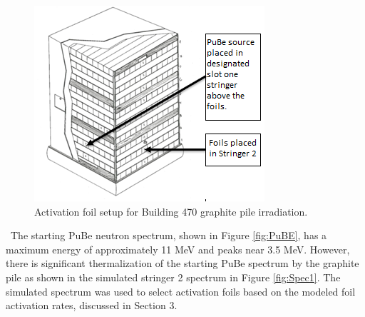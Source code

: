\documentclass[journal]{IEEEtran}
\let\MYoriglatexcaption\caption
\renewcommand{\caption}[2][\relax]{\MYoriglatexcaption[#2]{#2}}
\begin{document}
\begin{figure}[h!]
	\includegraphics[width=\linewidth]{Figures/PileSetup.png}
	\caption{Activation foil setup for Building 470 graphite pile irradiation.}
	\label{fig:pile}
\end{figure}

\ The starting PuBe neutron spectrum, shown in Figure \ref{fig:PuBE}, has a maximum energy of approximately 11 MeV and peaks near 3.5 MeV. 
However, there is significant thermalization of the starting PuBe spectrum by the graphite pile as shown in the simulated stringer 2 spectrum in Figure \ref{fig:Spec1}. 
The simulated spectrum was used to select activation foils based on the modeled foil activation rates, discussed in Section 3. 
\end{document}
